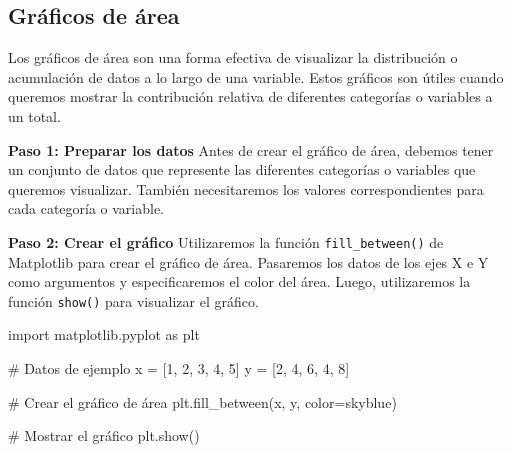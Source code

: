 \documentclass[
  a4paper,
]{article}
\newenvironment{Shaded}{}{}
\newcommand{\CommentTok}[1]{\textcolor[rgb]{0.42,0.45,0.49}{#1}}
\newcommand{\DecValTok}[1]{\textcolor[rgb]{0.00,0.36,0.77}{#1}}
\newcommand{\ImportTok}[1]{\textcolor[rgb]{0.01,0.18,0.38}{#1}}
\newcommand{\NormalTok}[1]{\textcolor[rgb]{0.14,0.16,0.18}{#1}}
\newcommand{\OperatorTok}[1]{\textcolor[rgb]{0.14,0.16,0.18}{#1}}
\newcommand{\StringTok}[1]{\textcolor[rgb]{0.01,0.18,0.38}{#1}}
\begin{document}
\hypertarget{gruxe1ficos-de-uxe1rea}{%
\subsection{Gráficos de área}\label{gruxe1ficos-de-uxe1rea}}

Los gráficos de área son una forma efectiva de visualizar la
distribución o acumulación de datos a lo largo de una variable. Estos
gráficos son útiles cuando queremos mostrar la contribución relativa de
diferentes categorías o variables a un total.

\textbf{Paso 1: Preparar los datos} Antes de crear el gráfico de área,
debemos tener un conjunto de datos que represente las diferentes
categorías o variables que queremos visualizar. También necesitaremos
los valores correspondientes para cada categoría o variable.

\textbf{Paso 2: Crear el gráfico} Utilizaremos la función
\texttt{fill\_between()} de Matplotlib para crear el gráfico de área.
Pasaremos los datos de los ejes X e Y como argumentos y especificaremos
el color del área. Luego, utilizaremos la función \texttt{show()} para
visualizar el gráfico.

\begin{Shaded}
\begin{Highlighting}[]
\ImportTok{import}\NormalTok{ matplotlib.pyplot }\ImportTok{as}\NormalTok{ plt}

\CommentTok{\# Datos de ejemplo}
\NormalTok{x }\OperatorTok{=}\NormalTok{ [}\DecValTok{1}\NormalTok{, }\DecValTok{2}\NormalTok{, }\DecValTok{3}\NormalTok{, }\DecValTok{4}\NormalTok{, }\DecValTok{5}\NormalTok{]}
\NormalTok{y }\OperatorTok{=}\NormalTok{ [}\DecValTok{2}\NormalTok{, }\DecValTok{4}\NormalTok{, }\DecValTok{6}\NormalTok{, }\DecValTok{4}\NormalTok{, }\DecValTok{8}\NormalTok{]}

\CommentTok{\# Crear el gráfico de área}
\NormalTok{plt.fill\_between(x, y, color}\OperatorTok{=}\StringTok{\textquotesingle{}skyblue\textquotesingle{}}\NormalTok{)}

\CommentTok{\# Mostrar el gráfico}
\NormalTok{plt.show()}
\end{Highlighting}
\end{Shaded}
\end{document}
